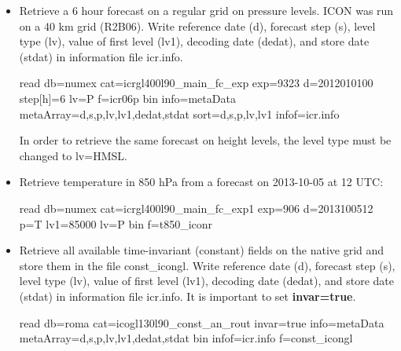 \begin{itemize}
\item Retrieve a 6 hour forecast on a regular grid on pressure levels. ICON was run on a 40 km
grid (R2B06).  Write reference date (d),
forecast step (s), level type (lv), value of first level (lv1), decoding date (dedat), and
store date (stdat) in information file icr.info.
\begin{skydb}
read db=numex cat=icrgl400l90_main_fc_exp exp=9323 d=2012010100 step[h]=6 lv=P f=icr06p bin info=metaData metaArray=d,s,p,lv,lv1,dedat,stdat sort=d,s,p,lv,lv1 infof=icr.info
\end{skydb}
In order to retrieve the same forecast on height levels, the level type must be changed to lv=HMSL.

\item Retrieve temperature in 850 hPa from a forecast on 2013-10-05 at 12 UTC:

\begin{skydb}
read db=numex cat=icrgl400l90_main_fc_exp1 exp=906 d=2013100512 p=T lv1=85000 lv=P bin f=t850_iconr
\end{skydb}

\item Retrieve all available time-invariant (constant) fields on the native grid and store them in the file const\_icongl. 
Write reference date (d), forecast step (s), level type (lv), value of first level (lv1), decoding date (dedat), 
and store date (stdat) in information file icr.info. It is important to set \textbf{invar=true}.

\begin{skydb}
read db=roma cat=icogl130l90_const_an_rout invar=true info=metaData metaArray=d,s,p,lv,lv1,dedat,stdat bin infof=icr.info f=const_icongl
\end{skydb}

\end{itemize}
